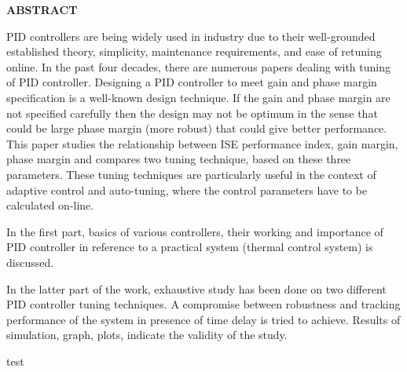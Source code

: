 \begin{center}
{\large {\bf  ABSTRACT }}
\end{center}  


    
PID controllers are being widely used in industry due to their well-grounded 
established theory, simplicity, maintenance requirements, and ease of retuning online. 
In  the  past  four  decades,  there  are  numerous  papers  dealing  with  tuning  of  PID 
controller. Designing a PID controller to meet gain and phase margin  specification is 
a  well-known  design  technique.  If  the  gain  and  phase  margin  are  not  specified 
carefully then the design may  not be optimum in the sense that could be  large phase 
margin  (more  robust)  that  could  give  better  performance.  This  paper  studies  the 
relationship between ISE performance index, gain margin, phase margin and 
compares  two  tuning  technique,  based  on  these  three  parameters.  These  tuning 
techniques  are  particularly  useful  in  the  context  of  adaptive  control  and  auto-tuning, 
where the control parameters have to be calculated on-line. 
 
In  the  first  part,  basics  of  various  controllers,  their  working  and  importance  of  PID 
controller in reference to a practical system (thermal control system) is discussed. 
 
In  the  latter  part  of  the  work,  exhaustive  study  has  been  done  on  two  different  PID 
controller tuning techniques. A compromise between robustness and tracking 
performance  of  the  system  in  presence  of  time  delay  is  tried  to  achieve.  Results  of 
simulation, graph, plots, indicate the validity of the study. 


test